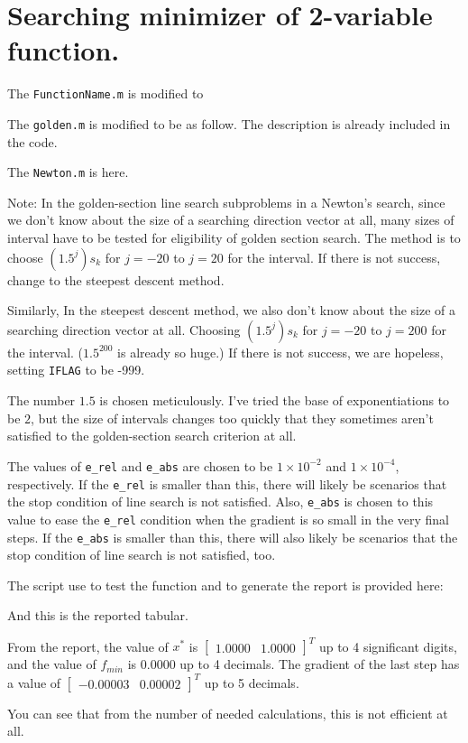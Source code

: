 \documentclass{article}
\begin{document}
\section*{Searching minimizer of 2-variable function.}

The \lstinline{FunctionName.m} is modified to



The \lstinline{golden.m} is modified to be as follow. The description is already included in the code.



The \lstinline{Newton.m} is here.



Note: In the golden-section line search subproblems in a Newton's search, since we don't know about the size of a searching direction vector at all, many sizes of interval have to be tested for eligibility of golden section search. The method is to choose $(1.5^j)s_k$ for $j = -20$ to $j = 20$ for the interval. If there is not success, change to the steepest descent method.

Similarly, In the steepest descent method, we also don't know about the size of a searching direction vector at all. Choosing $(1.5^j)s_k$ for $j = -20$ to $j = 200$ for the interval. ($1.5^{200}$ is already so huge.) If there is not success, we are hopeless, setting \lstinline{IFLAG} to be -999.

The number $1.5$ is chosen meticulously. I've tried the base of exponentiations to be $2$, but the size of intervals changes too quickly that they sometimes aren't satisfied to the golden-section search criterion at all.

The values of \lstinline{e_rel} and \lstinline{e_abs} are chosen to be $1 \times 10^{-2}$ and $1 \times 10^{-4}$, respectively. If the \lstinline{e_rel} is smaller than this, there will likely be scenarios that the stop condition of line search is not satisfied. Also, \lstinline{e_abs} is chosen to this value to ease the \lstinline{e_rel} condition when the gradient is so small in the very final steps. If the \lstinline{e_abs} is smaller than this, there will also likely be scenarios that the stop condition of line search is not satisfied, too.

The script use to test the function and to generate the report is provided here:



And this is the reported tabular.



From the report, the value of $x^*$ is $\begin{bmatrix}
    1.0000 & 1.0000
\end{bmatrix}^T$ up to 4 significant digits, and the value of $f_{min}$ is $0.0000$ up to 4 decimals. The gradient of the last step has a value of $\begin{bmatrix}
    -0.00003 & 0.00002
\end{bmatrix}^T$ up to 5 decimals. 

You can see that from the number of needed calculations, this is not efficient at all.
\end{document}
